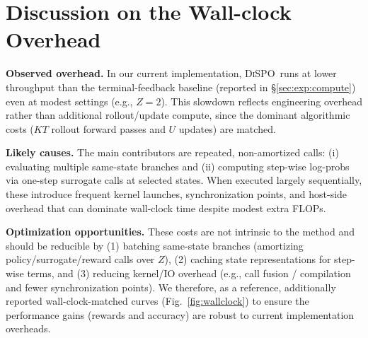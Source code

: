\documentclass{article}
\newcommand{\method}{{\textsc{DiSPO}}}
\theoremstyle{plain}
\theoremstyle{definition}
\theoremstyle{remark}
\begin{document}
\section{Discussion on the Wall-clock Overhead}
\label{app:wallclock}

\textbf{Observed overhead.}
In our current implementation, \method\ runs at lower throughput than the terminal-feedback baseline (reported in \S\ref{sec:exp:compute}) even at modest settings (e.g., $Z{=}2$).
This slowdown reflects engineering overhead rather than additional rollout/update compute, since the dominant algorithmic costs ($KT$ rollout forward passes and $U$ updates) are matched.

\textbf{Likely causes.}
The main contributors are repeated, non-amortized calls: (i) evaluating multiple same-state branches and (ii) computing step-wise log-probs via one-step surrogate calls at selected states.
When executed largely sequentially, these introduce frequent kernel launches, synchronization points, and host-side overhead that can dominate wall-clock time despite modest extra FLOPs.

\textbf{Optimization opportunities.}
These costs are not intrinsic to the method and should be reducible by (1) batching same-state branches (amortizing policy/surrogate/reward calls over $Z$), (2) caching state representations for step-wise terms, and (3) reducing kernel/IO overhead (e.g., call fusion / compilation and fewer synchronization points).
We therefore, as a reference, additionally reported wall-clock-matched curves (Fig.~\ref{fig:wallclock}) to ensure the performance gains (rewards and accuracy) are robust to current implementation overheads.



\end{document}
